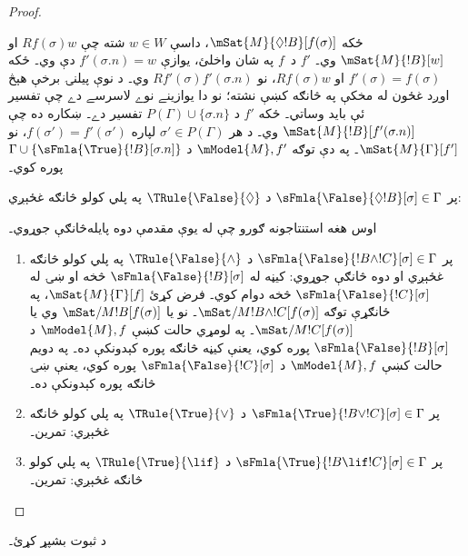 \documentclass[../../../include/open-logic-section]{subfiles}
\begin{document}
\begin{proof}
\begin{enumerate}
{{  ځکه $\mSat{M}{\Diamond !B}[f(\sigma)]$، داسې $w \in W$ شته چې
  $Rf(\sigma)w$ او $\mSat{M}{!B}[w]$ وي۔ $f'$ د~$f$ په شان
  واخلئ، يوازې $f'(\sigma.n) = w$ دې وي۔ ځکه
  $f'(\sigma) = f(\sigma)$ او $Rf(\sigma)w$، نو
  $Rf'(\sigma)f'(\sigma.n)$ وي۔ د نوې پيلنۍ برخې هېڅ اوږد غځون
له مخکې په څانګه کښې نشته؛ نو دا يوازينے نوے لاسرسے دے چې
تفسير ئې بايد وساتي۔ ځکه $f'$ د
  $P(\Gamma) \cup \{\sigma.n\}$ تفسير دے۔ ښکاره ده چې
  $\mSat{M}{!B}[f'(\sigma.n)]$ وي۔ د هر
  $\sigma' \in P(\Gamma)$ لپاره $f(\sigma') = f'(\sigma')$،
  نو $\mSat{M}{\Gamma}[f']$۔ په دې توګه $\mModel{M}, f'$ د
  $\Gamma \cup \{\sFmla{\True}{!B}[\sigma.n]\}$ پوره کوي۔}
\item پر $\sFmla{\False}{\Diamond !B}[\sigma] \in \Gamma$ د
  $\TRule{\False}{\Diamond}$ په پلي کولو څانګه غځېږي:
  }{}
\end{enumerate}
اوس هغه استنتاجونه ګورو چې له يوې مقدمې دوه پايله‌څانګې جوړوي۔
\begin{enumerate}
\item پر $\sFmla{\False}{!B \land !C}[\sigma] \in \Gamma$ د
  $\TRule{\False}{\land}$ په پلي کولو څانګه غځېږي او دوه
  څانګې جوړوي: کيڼه له $\sFmla{\False}{!B}[\sigma]$ څخه او
  ښۍ له $\sFmla{\False}{!C}[\sigma]$ څخه دوام کوي۔ فرض کړئ
  $\mSat{M}{\Gamma}[f]$، په ځانګړې توګه
  $\mSat/{M}{!B \land !C}[f(\sigma)]$۔ نو يا
  $\mSat/{M}{!B}[f(\sigma)]$ وي يا
  $\mSat/{M}{!C}[f(\sigma)]$۔ په لومړي حالت کښې
  $\mModel{M}, f$ د $\sFmla{\False}{!B}[\sigma]$ پوره کوي،
  يعنې کيڼه څانګه پوره کېدونکې ده۔ په دويم حالت کښې
  $\mModel{M}, f$ د $\sFmla{\False}{!C}[\sigma]$ پوره کوي،
  يعنې ښۍ څانګه پوره کېدونکې ده۔
\item پر $\sFmla{\True}{!B \lor !C}[\sigma] \in \Gamma$ د
  $\TRule{\True}{\lor}$ په پلي کولو څانګه غځېږي: تمرين۔
\item پر $\sFmla{\True}{!B \lif !C}[\sigma] \in \Gamma$ د
  $\TRule{\True}{\lif}$ په پلي کولو څانګه غځېږي: تمرين۔
\end{enumerate}
\end{proof}

\begin{prob}
د  ثبوت بشپړ کړئ۔
\end{prob}
\end{document}

